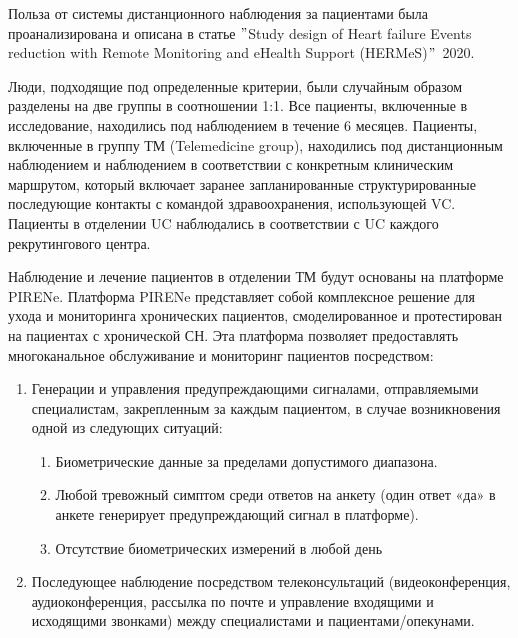 \documentclass[a4paper,12pt]{article}
\begin{document}
    Польза от системы дистанционного наблюдения за пациентами была проанализирована и описана в статье \("\)Study design of Heart failure Events reduction with Remote Monitoring and eHealth Support (HERMeS)\("\)\, 2020. \par
    Люди, подходящие под определенные критерии, были случайным образом разделены на две группы в соотношении 1:1.
    Все пациенты, включенные в исследование, находились под наблюдением в течение 6 месяцев.
    Пациенты, включенные в группу ТМ (Telemedicine group), находились под дистанционным наблюдением и наблюдением в соответствии с конкретным клиническим маршрутом, который включает заранее запланированные структурированные последующие контакты с командой здравоохранения, использующей VC. Пациенты в отделении UC наблюдались в соответствии с UC каждого рекрутингового центра. \par
    Наблюдение и лечение пациентов в отделении ТМ будут основаны на платформе PIRENe. Платформа PIRENe представляет собой комплексное решение для ухода и мониторинга хронических пациентов, смоделированное и протестирован на пациентах с хронической СН.
    Эта платформа позволяет предоставлять многоканальное обслуживание и мониторинг пациентов посредством: \par
    \begin{enumerate}
         пациента
        \begin{enumerate}
            \item Биометрические данные (вес, ЧСС и АД);
            \item Отчет о симптомах: семь вопросов, чтобы отразить ухудшение симптомов сердечно-сосудистых заболеваний, в основном ухудшение СН, и один вопрос, чтобы отразить общее ухудшение (см.\ Таблицу~\ref{tab:timesandtenses}).
            Вопросы ставятся так, чтобы ответить «да» или «нет».
        \end{enumerate}
        \item Генерации и управления предупреждающими сигналами, отправляемыми специалистам, закрепленным за каждым пациентом, в случае возникновения одной из следующих ситуаций:
        \begin{enumerate}
            \item Биометрические данные за пределами допустимого диапазона.
            \item Любой тревожный симптом среди ответов на анкету (один ответ «да» в анкете генерирует предупреждающий сигнал в платформе).
            \item Отсутствие биометрических измерений в любой день
        \end{enumerate}
        \item Последующее наблюдение посредством телеконсультаций (видеоконференция, аудиоконференция, рассылка по почте и управление входящими и исходящими звонками) между специалистами и пациентами/опекунами.
    \end{enumerate}
\end{document}
